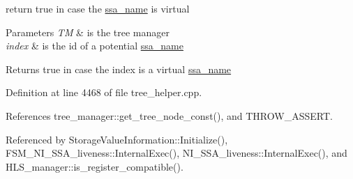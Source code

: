 return true in case the \hyperlink{structssa__name}{ssa\+\_\+name} is virtual 


\begin{DoxyParams}{Parameters}
{\em TM} & is the tree manager \\
\hline
{\em index} & is the id of a potential \hyperlink{structssa__name}{ssa\+\_\+name} \\
\hline
\end{DoxyParams}
\begin{DoxyReturn}{Returns}
true in case the index is a virtual \hyperlink{structssa__name}{ssa\+\_\+name} 
\end{DoxyReturn}


Definition at line 4468 of file tree\+\_\+helper.\+cpp.



References tree\+\_\+manager\+::get\+\_\+tree\+\_\+node\+\_\+const(), and T\+H\+R\+O\+W\+\_\+\+A\+S\+S\+E\+RT.



Referenced by Storage\+Value\+Information\+::\+Initialize(), F\+S\+M\+\_\+\+N\+I\+\_\+\+S\+S\+A\+\_\+liveness\+::\+Internal\+Exec(), N\+I\+\_\+\+S\+S\+A\+\_\+liveness\+::\+Internal\+Exec(), and H\+L\+S\+\_\+manager\+::is\+\_\+register\+\_\+compatible().

